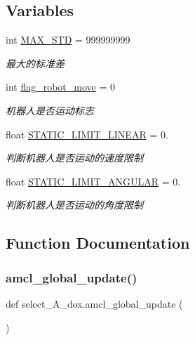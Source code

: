 \subsection*{Variables}
\begin{DoxyCompactItemize}
\item 
int \hyperlink{namespaceselect___a__dox_ae625bd87a3d659c478623a68cd8419a0}{M\+A\+X\+\_\+\+S\+TD} = 999999999
\begin{DoxyCompactList}\small\item\em 最大的标准差 \end{DoxyCompactList}\item 
int \hyperlink{namespaceselect___a__dox_aab650782f9bf9e653748df1ce43ba0a3}{flag\+\_\+robot\+\_\+move} = 0
\begin{DoxyCompactList}\small\item\em 机器人是否运动标志 \end{DoxyCompactList}\item 
float \hyperlink{namespaceselect___a__dox_a0fedd571655449b271f61079a0c85510}{S\+T\+A\+T\+I\+C\+\_\+\+L\+I\+M\+I\+T\+\_\+\+L\+I\+N\+E\+AR} = 0.
\begin{DoxyCompactList}\small\item\em 判断机器人是否运动的速度限制 \end{DoxyCompactList}\item 
float \hyperlink{namespaceselect___a__dox_a8c2c2dd96dd9f11315bf9092c248b7f6}{S\+T\+A\+T\+I\+C\+\_\+\+L\+I\+M\+I\+T\+\_\+\+A\+N\+G\+U\+L\+AR} = 0.
\begin{DoxyCompactList}\small\item\em 判断机器人是否运动的角度限制 \end{DoxyCompactList}\end{DoxyCompactItemize}


\subsection{Function Documentation}
\mbox{\label{namespaceselect___a__dox_a4c38eb63cc34fdb7d60461a006f34100}} 
\subsubsection{\texorpdfstring{amcl\+\_\+global\+\_\+update()}{amcl\_global\_update()}}
{\footnotesize\ttfamily def select\+\_\+\+A\+\_\+dox.\+amcl\+\_\+global\+\_\+update (\begin{DoxyParamCaption}{ }\end{DoxyParamCaption})}



